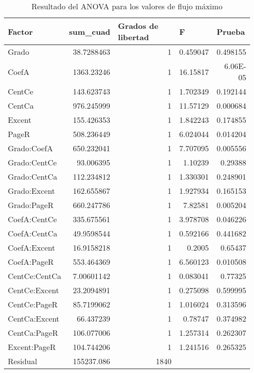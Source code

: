 \documentclass{article}
\begin{document}
\begin{table}[htbp]
  \centering
  \caption{Resultado del ANOVA para los valores de flujo máximo}
    \begin{tabular}{|l|r|r|r|r|}
    \toprule
    \rowcolor[rgb]{ .357,  .608,  .835} \textbf{Factor} & \multicolumn{1}{l|}{\textbf{sum\_cuad}} & \multicolumn{1}{l|}{\textbf{Grados de libertad}} & \multicolumn{1}{l|}{\textbf{F}} & \multicolumn{1}{l|}{\textbf{Prueba}} \\
    \midrule
    Grado & 38.7288463 & 1     & 0.459047 & 0.498155 \\
    \midrule
    CoefA & 1363.23246 & 1     & 16.15817 & 6.06E-05 \\
    \midrule
    CentCe & 143.623743 & 1     & 1.702349 & 0.192144 \\
    \midrule
    CentCa & 976.245999 & 1     & 11.57129 & 0.000684 \\
    \midrule
    Excent & 155.426353 & 1     & 1.842243 & 0.174855 \\
    \midrule
    PageR & 508.236449 & 1     & 6.024044 & 0.014204 \\
    \midrule
    Grado:CoefA & 650.232041 & 1     & 7.707095 & 0.005556 \\
    \midrule
    Grado:CentCe & 93.006395 & 1     & 1.10239 & 0.29388 \\
    \midrule
    Grado:CentCa & 112.234812 & 1     & 1.330301 & 0.248901 \\
    \midrule
    Grado:Excent & 162.655867 & 1     & 1.927934 & 0.165153 \\
    \midrule
    Grado:PageR & 660.247786 & 1     & 7.82581 & 0.005204 \\
    \midrule
    CoefA:CentCe & 335.675561 & 1     & 3.978708 & 0.046226 \\
    \midrule
    CoefA:CentCa & 49.9598544 & 1     & 0.592166 & 0.441682 \\
    \midrule
    CoefA:Excent & 16.9158218 & 1     & 0.2005 & 0.65437 \\
    \midrule
    CoefA:PageR & 553.464369 & 1     & 6.560123 & 0.010508 \\
    \midrule
    CentCe:CentCa & 7.00601142 & 1     & 0.083041 & 0.77325 \\
    \midrule
    CentCe:Excent & 23.2094891 & 1     & 0.275098 & 0.599995 \\
    \midrule
    CentCe:PageR & 85.7199062 & 1     & 1.016024 & 0.313596 \\
    \midrule
    CentCa:Excent & 66.437239 & 1     & 0.78747 & 0.374982 \\
    \midrule
    CentCa:PageR & 106.077006 & 1     & 1.257314 & 0.262307 \\
    \midrule
    Excent:PageR & 104.744206 & 1     & 1.241516 & 0.265325 \\
    \midrule
    Residual & 155237.086 & 1840  &       &  \\
    \bottomrule
    \end{tabular}%
  \label{tab:Cuadro 2}%
\end{table}%
\end{document}
